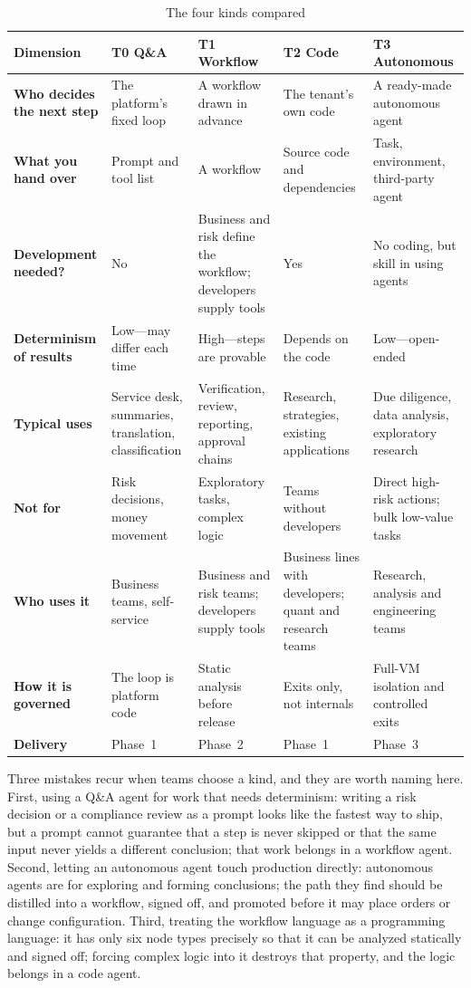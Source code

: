 \begin{table}[htbp]
\centering
\caption{The four kinds compared}
\label{tab:types-compare}
\begin{tabularx}{\textwidth}{@{}>{\bfseries}L{2.5cm}YYYY@{}}
  \toprule
  \textbf{Dimension} & \textbf{T0 Q\&A} & \textbf{T1 Workflow} & \textbf{T2 Code} & \textbf{T3 Autonomous}\\
  \midrule
  Who decides the next step & The platform's fixed loop & A workflow drawn in advance & The tenant's own code & A ready-made autonomous agent\\
  What you hand over & Prompt and tool list & A workflow & Source code and dependencies & Task, environment, third-party agent\\
  Development needed? & No & Business and risk define the workflow; developers supply tools & Yes & No coding, but skill in using agents\\
  Determinism of results & Low---may differ each time & High---steps are provable & Depends on the code & Low---open-ended\\
  Typical uses & Service desk, summaries, translation, classification & Verification, review, reporting, approval chains & Research, strategies, existing applications & Due diligence, data analysis, exploratory research\\
  Not for & Risk decisions, money movement & Exploratory tasks, complex logic & Teams without developers & Direct high-risk actions; bulk low-value tasks\\
  Who uses it & Business teams, self-service & Business and risk teams; developers supply tools & Business lines with developers; quant and research teams & Research, analysis and engineering teams\\
  How it is governed & The loop is platform code & Static analysis before release & Exits only, not internals & Full-VM isolation and controlled exits\\
  Delivery & Phase~1 & Phase~2 & Phase~1 & Phase~3\\
  \bottomrule
\end{tabularx}
\end{table}

Three mistakes recur when teams choose a kind, and they are worth naming here. First, using a Q\&A agent for work that needs determinism: writing a risk decision or a compliance review as a prompt looks like the fastest way to ship, but a prompt cannot guarantee that a step is never skipped or that the same input never yields a different conclusion; that work belongs in a workflow agent. Second, letting an autonomous agent touch production directly: autonomous agents are for exploring and forming conclusions; the path they find should be distilled into a workflow, signed off, and promoted before it may place orders or change configuration. Third, treating the workflow language as a programming language: it has only six node types precisely so that it can be analyzed statically and signed off; forcing complex logic into it destroys that property, and the logic belongs in a code agent.

